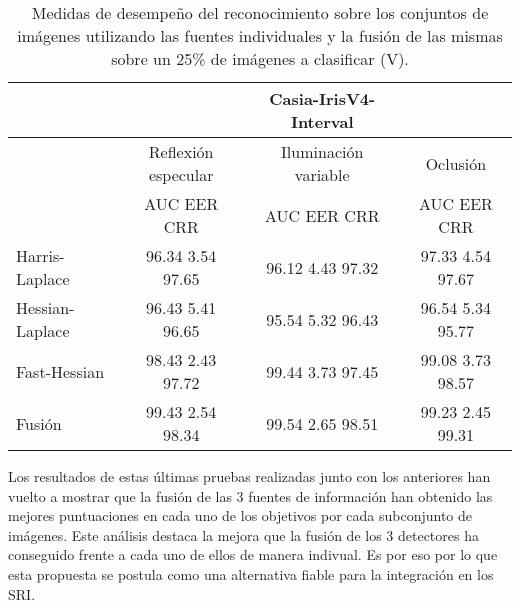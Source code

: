 \begin{table}[h]
\begin{center}
\begin{tabular}{@{}lccc@{}}
\toprule
&& Casia-IrisV4-Interval & \\ \hline
&Reflexión especular		&  	Iluminación variable		& Oclusión \\ \hline
&AUC  \phantom{aa} EER  \phantom{aa} CRR &  	AUC  \phantom{aa} EER  \phantom{aa} CRR		& AUC  \phantom{aa} EER  \phantom{aa} CRR \\ \hline
Harris-Laplace& 96.34 \phantom{aa} 3.54  \phantom{aa} 97.65 &  	96.12 \phantom{aa} 4.43  \phantom{aa}97.32		& 97.33 \phantom{aa} 4.54 \phantom{aa} 97.67 \\
Hessian-Laplace& 96.43 \phantom{aa} 5.41  \phantom{aa} 96.65 &  	95.54 \phantom{aa} 5.32 \phantom{aa} 96.43 & 96.54 \phantom{aa} 5.34 \phantom{aa} 95.77\\
Fast-Hessian& 98.43  \phantom{aa}2.43 \phantom{aa}  97.72 &  	99.44 \phantom{aa} 3.73 \phantom{aa}97.45		& 99.08  \phantom{aa}3.73 \phantom{aa} 98.57 \\
Fusión& 99.43 \phantom{aa} 2.54  \phantom{aa}98.34 &  	99.54  \phantom{aa}2.65 \phantom{aa} 98.51		& 99.23 \phantom{aa} 2.45  \phantom{aa}99.31 \\ \hline

\end{tabular}
\end{center}
\caption{Medidas de desempeño del reconocimiento sobre los conjuntos de imágenes utilizando las fuentes individuales y la fusión de las mismas sobre un 25\% de imágenes a clasificar (V).}
\label{my_tabla}
\end{table}

\newpage

Los resultados de estas últimas pruebas realizadas junto con los anteriores han vuelto a mostrar que la fusión de las 3 fuentes de información han obtenido las mejores puntuaciones en cada uno de los objetivos por cada subconjunto de imágenes. Este análisis destaca la mejora que la fusión de los 3 detectores ha conseguido frente a cada uno de ellos de manera indivual. Es por eso por lo que esta propuesta se postula como una alternativa fiable para la integración en los SRI. \\



